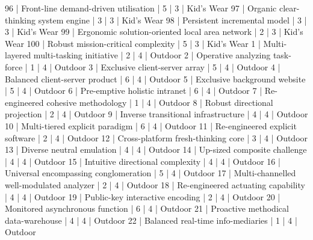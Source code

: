 \begin{enumerate}
\begin{pseudo*}
      96 | Front-line demand-driven utilisation             |        5 |      3 | Kid's Wear    
      97 | Organic clear-thinking system engine             |        3 |      3 | Kid's Wear    
      98 | Persistent incremental model                     |        3 |      3 | Kid's Wear    
      99 | Ergonomic solution-oriented local area network   |        2 |      3 | Kid's Wear    
     100 | Robust mission-critical complexity               |        5 |      3 | Kid's Wear    
       1 | Multi-layered multi-tasking initiative           |        2 |      4 | Outdoor       
       2 | Operative analyzing task-force                   |        1 |      4 | Outdoor       
       3 | Exclusive client-server array                    |        5 |      4 | Outdoor       
       4 | Balanced client-server product                   |        6 |      4 | Outdoor       
       5 | Exclusive background website                     |        5 |      4 | Outdoor       
       6 | Pre-emptive holistic intranet                    |        6 |      4 | Outdoor       
       7 | Re-engineered cohesive methodology               |        1 |      4 | Outdoor       
       8 | Robust directional projection                    |        2 |      4 | Outdoor       
       9 | Inverse transitional infrastructure              |        4 |      4 | Outdoor       
      10 | Multi-tiered explicit paradigm                   |        6 |      4 | Outdoor       
      11 | Re-engineered explicit software                  |        2 |      4 | Outdoor       
      12 | Cross-platform fresh-thinking core               |        3 |      4 | Outdoor       
      13 | Diverse neutral emulation                        |        4 |      4 | Outdoor       
      14 | Up-sized composite challenge                     |        4 |      4 | Outdoor       
      15 | Intuitive directional complexity                 |        4 |      4 | Outdoor       
      16 | Universal encompassing conglomeration            |        5 |      4 | Outdoor       
      17 | Multi-channelled well-modulated analyzer         |        2 |      4 | Outdoor       
      18 | Re-engineered actuating capability               |        4 |      4 | Outdoor       
      19 | Public-key interactive encoding                  |        2 |      4 | Outdoor       
      20 | Monitored asynchronous function                  |        6 |      4 | Outdoor       
      21 | Proactive methodical data-warehouse              |        4 |      4 | Outdoor       
      22 | Balanced real-time info-mediaries                |        1 |      4 | Outdoor       

\end{pseudo*}
\end{enumerate}
